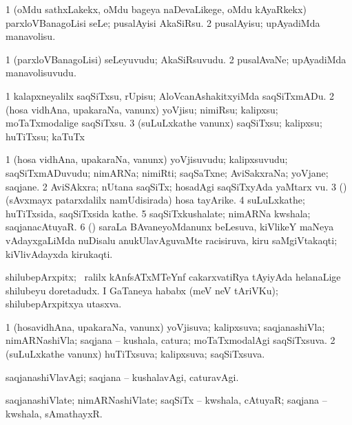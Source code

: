 \bentry
{}
\gl{\sakirx}
\bmng
\bnum
\num{1} (oMdu sathxLakekx, oMdu bageya naDevaLikege, oMdu kAyaRkekx) parxloVBanagoLisi seLe; pusalAyisi AkaSiRsu. 
\num{2} pusalAyisu; upAyadiMda manavolisu. 
\enum
\emng
\eentry

\bentry
{}
\gl{\nA}
\bmng
\bnum
\num{1} (parxloVBanagoLisi) seLeyuvudu; AkaSiRsuvudu. 
\num{2} pusalAvaNe; upAyadiMda manavolisuvudu. 
\enum
\emng
\eentry

\bentry
{}
\gl{\sakirx}
\bmng
\bnum
\num{1} kalapxneyalilx saqSiTxsu, rUpisu; AloVcanAshakitxyiMda saqSiTxmADu. 
\num{2} (hosa vidhAna, upakaraNa, \mo vanunx) yoVjisu; nimiRsu; kalipxsu; moTaTxmodalige saqSiTxsu. 
\num{3} (suLuLxkathe \mo vanunx) saqSiTxsu; kalipxsu; huTiTxsu; kaTuTx 
\enum
\emng
\eentry

\bentry
{}
\gl{\nA}
\bmng
\bnum
\num{1} (hosa vidhAna, upakaraNa, \mo vanunx) yoVjisuvudu; kalipxsuvudu; saqSiTxmADuvudu; nimARNa; nimiRti; saqSaTxne; AviSakxraNa; yoVjane; saqjane. 
\num{2} AviSAkxra; nUtana saqSiTx; hosadAgi saqSiTxyAda yaMtarx \mo vu. 
\num{3} (\nAyxshA) (sAvxmayx patarxdalilx namUdisirada) hosa tayArike. 
\num{4} suLuLxkathe; huTiTxsida, saqSiTxsida kathe. 
\num{5} saqSiTxkushalate; nimARNa kwshala; saqjanacAtuyaR. 
\num{6} (\saM) saraLa BAvaneyoMdanunx beLesuva, kiVlikeY maNeya vAdayxgaLiMda nuDisalu anukUlavAguvaMte racisiruva, kiru saMgiVtakaqti; kiVlivAdayxda kirukaqti. 
\enum
\emng

\noindent 
\gl{\pagu}
\bmng
{} 
\banum
{} shilubepArxpitx; \kirxsha\ ralilx kAnfsATxMTeYnf cakarxvatiRya tAyiyAda helanaLige shilubeyu doretadudx. 
 I GaTaneya hababx (meV neV tAriVKu); shilubepArxpitxya utasxva. 
\eanum
\emng
\eentry

\bentry
{}
\gl{\gu}
\bmng
\bnum
\num{1} (hosavidhAna, upakaraNa, \mo vanunx) yoVjisuva; kalipxsuva; saqjanashiVla; nimARNashiVla; saqjana -- kushala, catura; moTaTxmodalAgi saqSiTxsuva. 
\num{2} (suLuLxkathe \mo vanunx) huTiTxsuva; kalipxsuva; saqSiTxsuva. 
\enum
\emng
\eentry

\bentry
{}
\gl{\kirxvi}
\bmng
saqjanashiVlavAgi; saqjana -- kushalavAgi, caturavAgi. 
\emng
\eentry

\bentry
{}
\gl{\nA}
\bmng
saqjanashiVlate; nimARNashiVlate; saqSiTx -- kwshala, cAtuyaR; saqjana -- kwshala, sAmathayxR. 
\emng
\eentry

